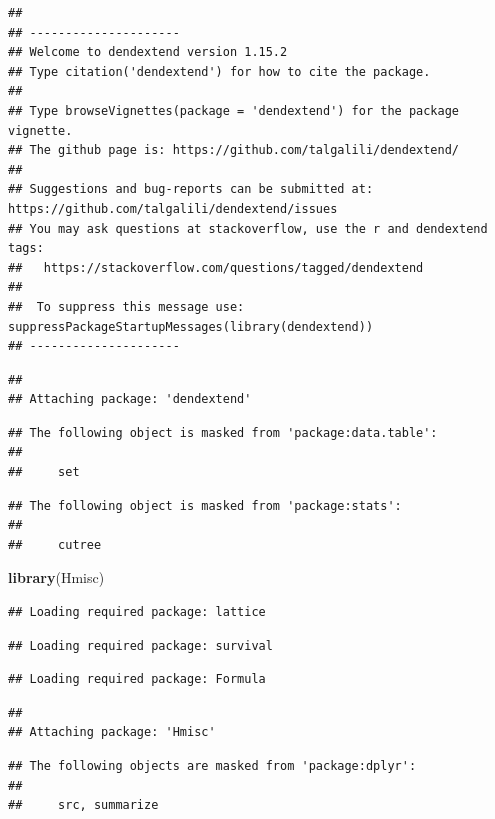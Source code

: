 \documentclass[]{article}
\newenvironment{Shaded}{\begin{snugshade}}{\end{snugshade}}
\newcommand{\KeywordTok}[1]{\textcolor[rgb]{0.13,0.29,0.53}{\textbf{#1}}}
\newcommand{\NormalTok}[1]{#1}
\begin{document}
\begin{verbatim}
## 
## ---------------------
## Welcome to dendextend version 1.15.2
## Type citation('dendextend') for how to cite the package.
## 
## Type browseVignettes(package = 'dendextend') for the package vignette.
## The github page is: https://github.com/talgalili/dendextend/
## 
## Suggestions and bug-reports can be submitted at: https://github.com/talgalili/dendextend/issues
## You may ask questions at stackoverflow, use the r and dendextend tags: 
##   https://stackoverflow.com/questions/tagged/dendextend
## 
##  To suppress this message use:  suppressPackageStartupMessages(library(dendextend))
## ---------------------
\end{verbatim}

\begin{verbatim}
## 
## Attaching package: 'dendextend'
\end{verbatim}

\begin{verbatim}
## The following object is masked from 'package:data.table':
## 
##     set
\end{verbatim}

\begin{verbatim}
## The following object is masked from 'package:stats':
## 
##     cutree
\end{verbatim}

\begin{Shaded}
\begin{Highlighting}[]
\KeywordTok{library}\NormalTok{(Hmisc)}
\end{Highlighting}
\end{Shaded}

\begin{verbatim}
## Loading required package: lattice
\end{verbatim}

\begin{verbatim}
## Loading required package: survival
\end{verbatim}

\begin{verbatim}
## Loading required package: Formula
\end{verbatim}

\begin{verbatim}
## 
## Attaching package: 'Hmisc'
\end{verbatim}

\begin{verbatim}
## The following objects are masked from 'package:dplyr':
## 
##     src, summarize
\end{verbatim}
\end{document}
